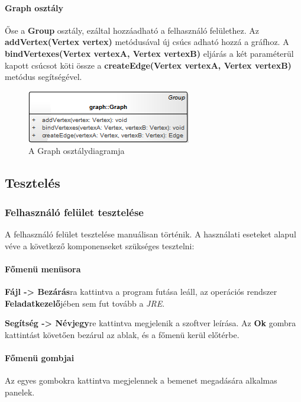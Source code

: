 \documentclass{elteikthesis}
\begin{document}
\paragraph{Graph osztály}
Őse a \textbf{Group} osztály, ezáltal hozzáadható a felhasználó felülethez. Az \textbf{addVertex(Vertex vertex)} metódusával új csúcs adható hozzá a gráfhoz. A \textbf{bindVertexes(Vertex vertexA, Vertex vertexB)} eljárás a két paraméterül kapott csúcsot köti össze a \textbf{createEdge(Vertex vertexA, Vertex vertexB)} metódus segítségével.
\begin{figure}[H]
	\centering
	\includegraphics{pics/class/Graph.png}
	\caption{A Graph osztálydiagramja}
\end{figure}
\subsection{Tesztelés}
\subsubsection{Felhasználó felület tesztelése}
A felhasználó felület tesztelése manuálisan történik. A használati eseteket alapul véve a következő komponenseket szükséges tesztelni:
\paragraph{Főmenü menüsora}
\textbf{Fájl -> Bezárás}ra kattintva a program futása leáll, az operációs rendszer \textbf{Feladatkezelő}jében sem fut tovább a \emph{JRE}.\par
\textbf{Segítség -> Névjegy}re kattintva megjelenik a szoftver leírása. Az \textbf{Ok} gombra kattintást követően bezárul az ablak, és a főmenü kerül előtérbe.
\paragraph{Főmenü gombjai}
Az egyes gombokra kattintva megjelennek a bemenet megadására alkalmas panelek.
\end{document}
